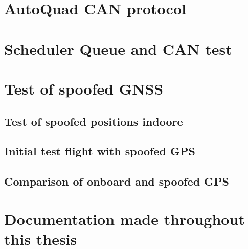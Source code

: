 \section{AutoQuad CAN protocol} \label{app:aq_can_protocol}



%


\section{Scheduler Queue and CAN test} \label{app:scheduler_and_can_test}



\section{Test of spoofed GNSS}


\subsection{Test of spoofed positions indoore}
\label{sec:test_of_spoofed_positions_indoore}



\subsection{Initial test flight with spoofed GPS}
\label{sec:test_of_spoofed_positions_outdoore}


\subsection{Comparison of onboard and spoofed GPS}
\label{sec:test_of_spoofed_positions_outdoore}


\section{Documentation made throughout this thesis}


